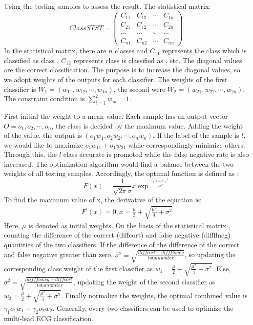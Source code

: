 \documentclass[conference]{IEEEtran}
\begin{document}
Using the testing samples to assess the result. The statistical matrix:
\begin{equation}
ClassSTST = \left(
\begin{array}{cccc}
 C_{11} & C_{12} & \cdots & C_{1n}\\
 C_{21} & C_{12} & \cdots & C_{2n}\\
 \cdots & \cdots & \ddots & \cdots\\
 C_{n1} & C_{n2} & \cdots & C_{nn}
\end{array}
\right)~
\end{equation}
In the statistical matrix, there are $n$ classes and $C_{11}$ represents the class \uppercase\expandafter{} which is classified as class \uppercase\expandafter{}, $C_{12}$ represents class \uppercase\expandafter{} is classified as \uppercase\expandafter{}, etc. 
The diagonal values are the correct classification. The purpose is to increase the diagonal values, so we adopt weights of the outputs for each classifier. 
The weights of the first classifier is $W_1 = (w_{11}, w_{12}, \cdots, w_{1n})$, the second were $W_2 = (w_{21}, w_{22}, \cdots, w_{2n})$. The constraint condition is $\sum\nolimits_{i=1}^2{w_{ik}} = 1$. 

First initial the weight to a mean value. Each sample has an output vector $O = {o_1, o_2, \cdots, o_n}$, the class is decided by the maximum value. Adding the weight of the value, the output is $(o_1w_1 ,o_2w_2, \cdots, o_nw_n)$. If the label of the sample is $l$, we would like to maximize $o_1w_{11} + o_1w_{21}$ while correspondingly minimize others. Through this, the $l$ class accurate is promoted while the false negative rate is also increased. The optimization algorithm would find a balance between the two weights of all testing samples. Accordingly, the optimal function is defined as :
\begin{equation}
F(x) = \frac{1}{\sqrt{2\pi}\sigma}x\exp^{-\frac{(x-\mu)^2}{2\sigma^2}}
\end{equation}
To find the maximum value of x, the derivative of the equation is:
\begin{equation}
\begin{split}
F^{'}(x) = 0, x = \frac{\mu}{2}+\sqrt{\frac{\mu^2}{4}+\sigma^2}
\end{split}
\end{equation}
Here, $\mu$ is denoted as initial weights. On the basis of the statistical matrix , counting the difference of the correct (diffcort) and false negative (diffflneg) quantities of the two classifiers. If the difference of the difference of the correct and false negative greater than zero, $\sigma^2 = \sqrt{\frac{diffcort - diffflsneg}{totalnumber}}$, so updating the corresponding class weight of the first classifier as $w_1 = \frac{\mu}{2}+\sqrt{\frac{\mu^2}{4}+\sigma^2}$. Else, $\sigma^2 = \sqrt{\frac{diffflsneg - diffcort}{totalnumber}}$, updating the weight of the second classifier as $w_2 = \frac{\mu}{2}+\sqrt{\frac{\mu^2}{4}+\sigma^2}$. Finally normalize the weights, the optimal combined value is $\gamma_1o_1w_1 + \gamma_2o_2w_2$. Generally, every two classifiers can be used to optimize the multi-lead ECG classification.
\end{document}
